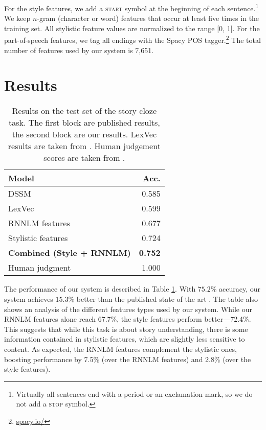 \documentclass[a4paper,11pt]{article}
\begin{document}
For  the style features, we add a \textsc{start} symbol at the beginning
of each sentence.\footnote{Virtually all sentences end with a period
  or an exclamation mark, so we do not add a \textsc{stop} symbol.} 
 We keep $n$-gram (character or word) features that occur at least five times in the training set.
All stylistic feature values are normalized to the range [0, 1].
For the part-of-speech features, we tag all endings with the Spacy POS tagger.\footnote{\url{spacy.io/}}
The total number of features used by our system is 7,651.


\section{Results}

\begin{table}%
\begin{center}
\begin{tabular}{|l|r|} \hline
{\bf Model} & {\bf Acc.} \\ \hline
{DSSM} \cite{Mostafazadeh:2016} & 0.585 \\ 
{LexVec} \cite{Salle:2016} & 0.599 \\ \hline\hline
{RNNLM features}		& 0.677 \\ 
{Stylistic features} & {0.724} \\ 
{\bf Combined (Style + RNNLM)} & {\bf 0.752} \\ \hline\hline
Human judgment & 1.000 \\ \hline
\end{tabular}
\end{center}
\caption{\label{cloze_results}
Results on the test set of the  story cloze task. 
The first block are published results, the second block are our results.
LexVec results are taken from \cite{Speer:2016}.
Human judgement scores are taken from \cite{Mostafazadeh:2016}. 
}
\end{table}

The performance of our system is described in Table \ref{cloze_results}. 
With $75.2\%$ accuracy, our system achieves $15.3\%$ better than the published state of the art \cite{Salle:2016}. 
The table also shows an analysis of the different features types used by our system.
While our RNNLM features alone reach 67.7\%, the style features perform better---72.4\%. 
This suggests that while this task is about story understanding, 
there is some information contained in stylistic features, which are slightly less sensitive to content.
As expected, the RNNLM features complement the stylistic ones, boosting performance by 7.5\% (over the RNNLM features) and 2.8\% (over the style features). 
\end{document}

